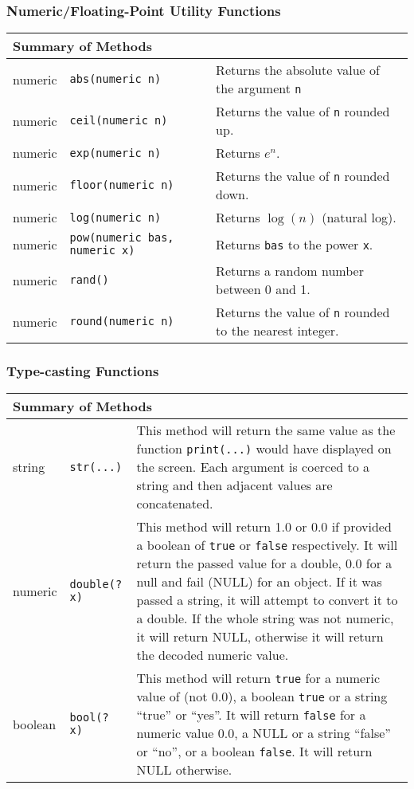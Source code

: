 \subsubsection{Numeric/Floating-Point Utility Functions}

\begin{tabular}{|p{0.8in}|p{2.2in}||p{3in}|}
  \hline
  \multicolumn{3}{|l|}{\textbf{Summary of Methods}}\\
  \hline
  numeric & {\tt abs(numeric n)} & Returns the absolute value of the argument {\tt n} \\
  numeric & {\tt ceil(numeric n)} & Returns the value of {\tt n} rounded up.\\
  numeric & {\tt exp(numeric n)} & Returns $e^{n}$.\\
  numeric & {\tt floor(numeric n)} & Returns the value of {\tt n} rounded down.\\
  numeric & {\tt log(numeric n)} & Returns $\log(n)$ (natural log).\\
  numeric & {\tt pow(numeric bas, numeric x)} & Returns {\tt bas} to the power {\tt x}.\\
  numeric & {\tt rand()} & Returns a random number between 0 and 1.\\
  numeric & {\tt round(numeric n)} & Returns the value of {\tt n} rounded to the nearest integer.\\
  \hline
\end{tabular}

\subsubsection{Type-casting Functions}

\begin{tabular}{|p{0.8in}|p{2.2in}||p{3in}|}
  \hline
  \multicolumn{3}{|l|}{\textbf{Summary of Methods}}\\
  \hline
  string & {\tt str(...)} & This method will return the same value as the function {\tt print(...)}
  would have displayed on the screen. Each argument is coerced to a string and then adjacent
  values are concatenated.\\
  numeric & {\tt double(? x)} & This method will return 1.0 or 0.0 if provided a boolean of 
  {\tt true} or {\tt false} respectively. It will return the passed value for a double,
  0.0 for a null and fail (NULL) for an object. If it was passed a string, it will attempt
  to convert it to a double. If the whole string was not numeric, it will return NULL, otherwise
  it will return the decoded numeric value.\\
  boolean & {\tt bool(? x)} & This method will return {\tt true} for a numeric value of (not 0.0), a
  boolean {\tt true} or a string ``true'' or ``yes''. It will return {\tt false} for a numeric
  value 0.0, a NULL or a string ``false'' or ``no'', or a boolean {\tt false}. It will
  return NULL otherwise.\\
  \hline
\end{tabular}

